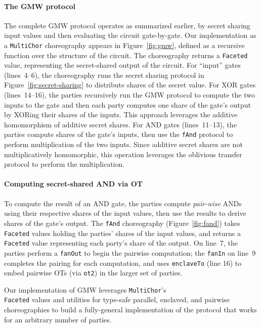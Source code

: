 \documentclass[sigplan,screen,review,anonymous]{acmart}
\newcommand{\inlinecode}[2][haskell]{\texttt{#2}}
\newcommand{\MultiChor}{\texttt{Multi\-Chor}\xspace}
\begin{document}
\paragraph{The GMW protocol}
The complete GMW protocol operates as summarized earlier, by secret sharing input values and then evaluating the circuit gate-by-gate. Our implementation as a \MultiChor choreography appears in Figure~\ref{fig:gmw}, defined as a recursive function over the structure of the circuit. The choreography returns a \inlinecode{Faceted} value, representing the secret-shared output of the circuit. For ``input'' gates (lines~4--6), the choreography runs the secret sharing protocol in Figure~\ref{fig:secret-sharing} to distribute shares of the secret value. For XOR gates (lines~14--16), the parties recursively run the GMW protocol to compute the two inputs to the gate and then each party computes one share of the gate's output by XORing their shares of the inputs. This approach leverages the additive homomorphism of additive secret shares. For AND gates (lines~11--13), the parties compute shares of the gate's inputs, then use the \inlinecode{fAnd} protocol to perform multiplication of the two inputs. Since additive secret shares are not multiplicatively homomorphic, this operation leverages the oblivious transfer protocol to perform the multiplication.

\paragraph{Computing secret-shared AND via OT}
To compute the result of an AND gate, the parties compute \emph{pair-wise} ANDs using their respective shares of the input values, then use the results to derive shares of the gate's output. The \inlinecode{fAnd} choreography (Figure~\ref{fig:fand}) takes \inlinecode{Faceted} values holding the parties' shares of the input values, and returns a \inlinecode{Faceted} value representing each party's share of the output. On line~7, the parties perform a \inlinecode{fanOut} to begin the pairwise computation; the \inlinecode{fanIn} on line~9 completes the pairing for each computation, and uses \inlinecode{enclaveTo} (line 16) to embed pairwise OTs (via \inlinecode{ot2}) in the larger set of parties.

Our implementation of GMW leverages \MultiChor's
\\
\inlinecode{Faceted} values and utilities for type-safe parallel, enclaved, and pairwise choreographies to build a fully-general implementation of the protocol that works for an arbitrary number of parties.
\end{document}
